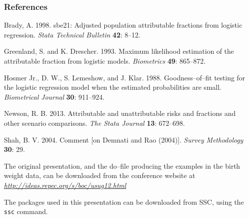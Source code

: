 \documentclass[11pt]{beamer}
\begin{document}
\begin{frame}
\frametitle{References}


{\scriptsize

\begin{thebibliography}{10}

Brady, A. 1998.
sbe21: Adjusted population attributable fractions from logistic regression.
\textsl{Stata Technical Bulletin} \textbf{42}: 8--12.

Greenland, S. and K. Drescher.  1993.
Maximum likelihood estimation of the attributable fraction from logistic models.
\textsl{Biometrics} \textbf{49}: 865--872.

Hosmer Jr., D. W., S. Lemeshow, and J. Klar.  1988.
Goodness--of--fit testing for the logistic regression model when the estimated probabilities are small.
\textsl{Biometrical Journal} \textbf{30}: 911--924.

Newson, R. B.  2013.
Attributable and unattributable risks and fractions and other scenario comparisons.
\textsl{The Stata Journal} \textbf{13}: 672--698.

Shah, B. V. 2004.
Comment [on Demnati and Rao (2004)].
\textsl{Survey Methodology} \textbf{30}: 29.

\end{thebibliography}

}

\bigskip

The original presentation, and the do--file producing the examples in the birth weight data,
can be downloaded from the conference website at
\href{http://ideas.repec.org/s/boc/usug12.html}{\textsl{http://ideas.repec.org/s/boc/usug12.html}}

\bigskip

The packages
used in this presentation
can be downloaded from SSC, using the \texttt{ssc} command.

\end{frame}
\end{document}
